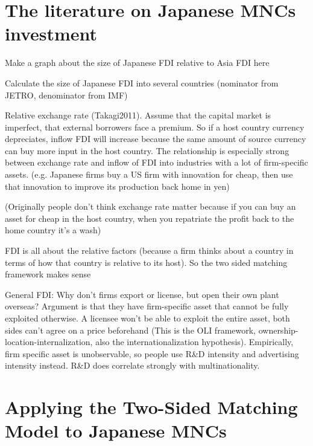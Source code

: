 \section{The literature on Japanese MNCs investment}

Make a graph about the size of Japanese FDI relative to Asia FDI here

Calculate the size of Japanese FDI into several countries (nominator from JETRO,
denominator from IMF)

Relative exchange rate (Takagi2011). Assume that the capital market is
imperfect, that external borrowers face a premium. So if a host country currency
depreciates, inflow FDI will increase because the same amount of source currency
can buy more input in the host country. The relationship is especially strong
between exchange rate and inflow of FDI into industries with a lot of
firm-specific assets. (e.g. Japanese firms buy a US firm with innovation for
cheap, then use that innovation to improve its production back home in yen)

(Originally people don't think exchange rate matter because if you can buy an
asset for cheap in the host country, when you repatriate the profit back to the
home country it's a wash)

FDI is all about the relative factors (because a firm thinks about a country in
terms of how that country is relative to its host). So the two sided matching
framework makes sense

General FDI: Why don't firms export or license, but open their own plant
overseas? Argument is that they have firm-specific asset that cannot be fully
exploited otherwise. A licensee won't be able to exploit the entire asset, both
sides can't agree on a price beforehand (This is the OLI framework,
ownership-location-internalization, also the internationalization hypothesis).
Empirically, firm specific asset is unobservable, so people use R\&D intensity
and advertising intensity instead. R\&D does correlate strongly with
multinationality.


\section{Applying the Two-Sided Matching Model to Japanese MNCs}
\label{sec:application}

